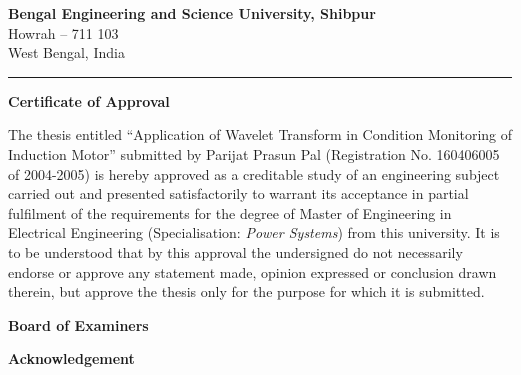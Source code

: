 \documentclass[a4paper,11pt]{report}
\begin{document}
\thispagestyle{empty}
\vspace*{7mm}
\begin{center}
{\Large \textbf{Bengal Engineering and Science University, Shibpur}}\\
\vspace{3.5pt}
{\large Howrah -- 711 103}\\
\vspace{3.5pt}
{\large West Bengal, India}
\end{center}
\hrule

\vspace{25mm}
\begin{center}
{\Large \textbf{Certificate of Approval}}
\end{center}

\noindent The thesis entitled ``Application of Wavelet Transform in Condition Monitoring of Induction Motor'' submitted by Parijat Prasun Pal (Registration No. 160406005 of 2004-2005) is hereby approved as a creditable study of an engineering subject carried out and presented satisfactorily to warrant its acceptance in partial fulfilment of the requirements for the degree of Master of Engineering in Electrical Engineering (Specialisation: \emph{Power Systems}) from this university. It is to be understood that by this approval the undersigned do not necessarily endorse or approve any statement made, opinion expressed or conclusion drawn therein, but approve the thesis only for the purpose for which it is submitted.

\vspace{25mm}
\hspace*{90mm} \textbf{Board of Examiners}

\vspace{40pt}
\hspace*{90mm} \dotfill
\vspace{20pt}
\hspace*{90mm} \dotfill
\vspace{20pt}
\hspace*{90mm} \dotfill

\clearpage

\thispagestyle{empty}
\vspace*{65mm}
\begin{center}
{\Large \textbf{Acknowledgement}}
\end{center}
\end{document}
